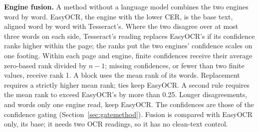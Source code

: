 \documentclass[conference]{IEEEtran}
\begin{document}
\textbf{Engine fusion.} A method without a language model combines the two engines word by word. EasyOCR, the engine with the lower CER, is the base text, aligned word by word with Tesseract's. Where the two disagree over at most three words on each side, Tesseract's reading replaces EasyOCR's if its confidence ranks higher within the page; the ranks put the two engines' confidence scales on one footing. Within each page and engine, finite confidences receive their average zero-based rank divided by $n-1$; missing confidences, or fewer than two finite values, receive rank 1. A block uses the mean rank of its words. Replacement requires a strictly higher mean rank; ties keep EasyOCR. A second rule requires the mean rank to exceed EasyOCR's by more than 0.25. Longer disagreements, and words only one engine read, keep EasyOCR. The confidences are those of the confidence gating (Section~\ref{sec:gatemethod}). Fusion is compared with EasyOCR only, its base; it needs two OCR readings, so it has no clean-text control.
\end{document}
